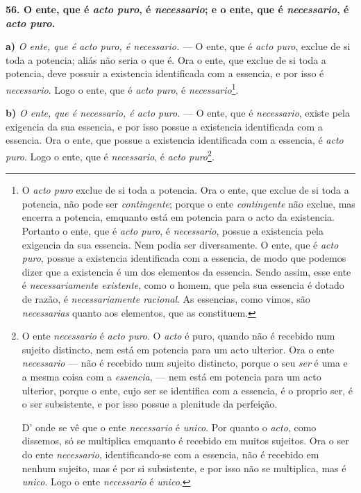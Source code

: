 \textbf{56. O ente, que é \emph{acto puro}, é \emph{necessario}; e o ente, que é \emph{necessario}, é \emph{acto puro}.}

\textbf{a)} \emph{O ente, que é acto puro, é necessario.} --- O ente, que é \emph{acto puro}, exclue de si toda a potencia; aliás não seria o que é. Ora o ente, que exclue de si toda a potencia, deve possuir a existencia identificada com a essencia, e por isso é \emph{necessario}. Logo o ente, que é \emph{acto puro}, é \emph{necessario}\footnote{O \emph{acto puro} exclue de si toda a potencia. Ora o ente, que exclue de si toda a potencia, não pode ser \emph{contingente}; porque o ente \emph{contingente} não exclue, mas encerra a potencia, emquanto está em potencia para o acto da existencia. Portanto o ente, que é \emph{acto puro}, é \emph{necessario}, possue a existencia pela exigencia da sua essencia. Nem podia ser diversamente. O ente, que é \emph{acto puro}, possue a existencia identificada com a essencia, de modo que podemos dizer que a existencia é um dos elementos da essencia. Sendo assim, esse ente é \emph{necessariamente existente}, como o homem, que pela sua essencia é dotado de razão, é \emph{necessariamente racional}. As essencias, como vimos, são \emph{necessarias} quanto aos elementos, que as constituem.}.

\textbf{b)} \emph{O ente, que é necessario, é acto puro.} --- O ente, que é \emph{necessario}, existe pela exigencia da sua essencia, e por isso possue a existencia identificada com a essencia. Ora o ente, que possue a existencia identificada com a essencia, é \emph{acto puro}. Logo o ente, que é \emph{necessario}, é \emph{acto puro}\footnote{O ente \emph{necessario} é \emph{acto puro}. O \emph{acto} é puro, quando não é recebido num sujeito distincto, nem está em potencia para um acto ulterior. Ora o ente \emph{necessario} --- não é recebido num sujeito distincto, porque o seu \emph{ser} é uma e a mesma coisa com a \emph{essencia}, --- nem está em potencia para um acto ulterior, porque o ente, cujo ser se identifica com a essencia, é o proprio ser, é o ser subsistente, e por isso possue a plenitude da perfeição.

\par D' onde se vê que o ente \emph{necessario} é \emph{unico}. Por quanto o \emph{acto}, como dissemos, só se multiplica emquanto é recebido em muitos sujeitos. Ora o ser do ente \emph{necessario}, identificando-se com a essencia, não é recebido em nenhum sujeito, mas é por si subsistente, e por isso não se multiplica, mas é \emph{unico}. Logo o ente \emph{necessario} é \emph{unico}.}.


